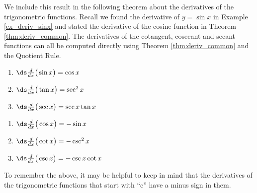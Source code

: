 We include this result in the following theorem about the derivatives of the trigonometric functions. Recall we found the derivative of $y=\sin x$ in Example \ref{ex_deriv_sinx} and stated the derivative of the cosine function in Theorem \ref{thm:deriv_common}. The derivatives of the cotangent, cosecant and secant functions can all be computed directly using Theorem \ref{thm:deriv_common} and the Quotient Rule.

{		\noindent\begin{minipage}[t]{.5\specialboxlength}
		\begin{enumerate}
		\item		$\ds \frac{d}{dx}\big(\sin x\big) = \cos x$\addtocounter{enumi}{1}
		\item		$\ds \frac{d}{dx}\big(\tan x\big) = \sec^2 x$\addtocounter{enumi}{1}
		\item		$\ds \frac{d}{dx}\big(\sec x\big) = \sec x\tan x$\addtocounter{enumi}{1}
		\end{enumerate}
		\end{minipage}
		\noindent\begin{minipage}[t]{.5\specialboxlength}
		\begin{enumerate}\addtocounter{enumi}{1}
		\item		$\ds \frac{d}{dx}\big(\cos x\big) = -\sin x$\addtocounter{enumi}{1}
		\item		$\ds \frac{d}{dx}\big(\cot x\big) = -\csc^2 x$\addtocounter{enumi}{1}
		\item		$\ds \frac{d}{dx}\big(\csc x\big) = -\csc x\cot x$
		\end{enumerate}
		\end{minipage}
}

To remember the above, it may be helpful to keep in mind that the derivatives of the trigonometric functions that start with ``c'' have a minus sign in them.\\

